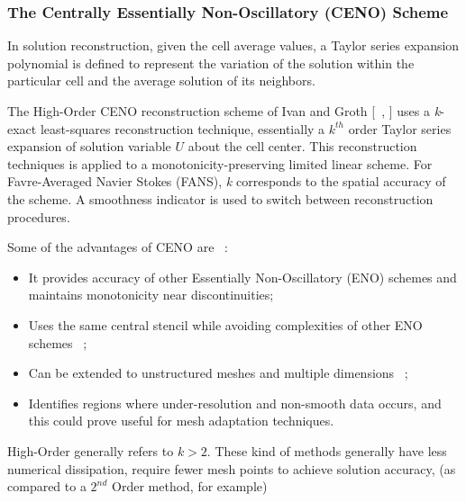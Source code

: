 \subsubsection{The Centrally Essentially Non-Oscillatory (CENO) Scheme}
\label{section:CENO}
In solution reconstruction, given the cell average values, a Taylor series expansion polynomial is defined to represent the variation of the solution within the particular cell and the average solution of its neighbors. \par
The High-Order CENO reconstruction scheme of Ivan and Groth [~\cite{ivan:2007}, \cite{ivan:2013b}] uses a \textit{k}-exact least-squares reconstruction technique, essentially a $k^{th}$ order Taylor series expansion of solution variable $U$ about the cell center. This reconstruction techniques is applied to a monotonicity-preserving limited linear scheme. For Favre-Averaged Navier Stokes (FANS), \textit{k} corresponds to the spatial accuracy of the scheme. A smoothness indicator is used to switch between reconstruction procedures.\par
Some of the advantages of CENO are ~\cite{Groth:2013}:
\begin{itemize}
\item It provides accuracy of other Essentially Non-Oscillatory (ENO) schemes and maintains monotonicity near discontinuities;
\item Uses the same central stencil while avoiding complexities of other ENO schemes ~\cite{ivan:2007, ivan:2013b};
\item Can be extended to unstructured meshes and multiple dimensions ~\cite{Charest:2013}; 
\item Identifies regions where under-resolution and non-smooth data occurs, and this could prove useful for mesh adaptation techniques.
\end{itemize}

High-Order generally refers to $k>2$. These kind of methods generally have less numerical dissipation, require fewer mesh points to achieve solution accuracy, (as compared to a $2^{nd}$ Order method, for example)